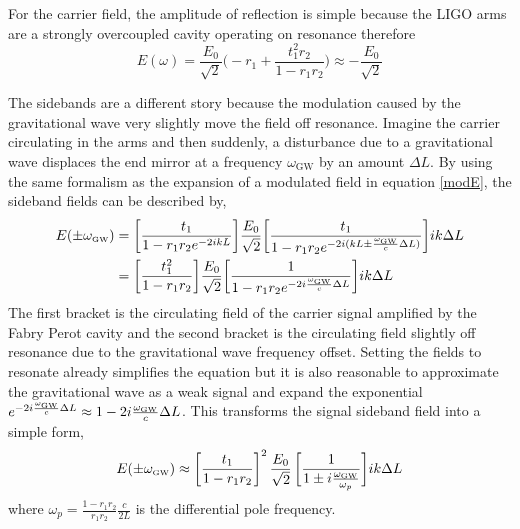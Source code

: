 		For the carrier field, the amplitude of reflection is simple because the LIGO arms are a strongly overcoupled cavity operating on resonance therefore 
		\begin{equation}
			E(\omega) = \frac{E_0}{\sqrt{2}}  \bigg(-r_1 + \frac{t_1^2 r_2}{1-r_1 r_2} \bigg) \approx -\frac{E_0}{\sqrt{2}}
		\end{equation}
		
		The sidebands are a different story because the modulation caused by the gravitational wave very slightly move the field off resonance.  Imagine the carrier circulating in the arms and then suddenly, a disturbance due to a gravitational wave displaces the end mirror at a frequency $\omega_\text{GW}$ by an amount $\Delta L$.   By using the same formalism as the expansion of a modulated field in equation \ref{modE}, the sideband fields can be described by,
		\begin{equation}
		\begin{aligned}
			E(\pm \omega_{\text{\tiny GW}}) &= \bigg[ \frac{t_1}{1-r_1 r_2 e^{-2ikL}}\bigg] \frac{E_0}{\sqrt{2}} \bigg[\frac{t_1}{1-r_1 r_2 e^{-2i (kL \pm \frac{\omega_{\text{\tiny GW}}}{c} \Delta L)}} \bigg] ik\Delta L\\
			& =  \bigg[ \frac{t_1^2}{1-r_1 r_2}\bigg]  \frac{E_0}{\sqrt{2}} \bigg[\frac{ 1}{1-r_1 r_2 e^{-2i \frac{\omega_{\text{\tiny GW}}}{c} \Delta L}} \bigg] ik\Delta L
		\end{aligned}
		\end{equation}
		The first bracket is the circulating field of the carrier signal amplified by the Fabry Perot cavity and the second bracket is the circulating field slightly off resonance due to the gravitational wave frequency offset.  Setting the fields to resonate already simplifies the equation but it is also reasonable to approximate the gravitational wave as a weak signal and expand the exponential $e^{- 2i \frac{\omega_{\text{\tiny GW}}}{c} \Delta L} \approx 1 - 2i\frac{\omega_{\text{\tiny GW}}}{c} \Delta L$.  This transforms the signal sideband field into a simple form,
		\begin{equation}
		E(\pm \omega_{\text{\tiny GW}}) \approx \bigg[\frac{t_1}{1-r_1r_2}\bigg]^2 \, \frac{E_0}{\sqrt{2}} \, \bigg[\frac{1}{1 \pm i \frac{\omega_{\text{\tiny GW}}}{\omega_p}}\bigg] ik\Delta L
		\end{equation}
		where $\omega_p = \frac{1-r_1r_2}{r_1r_2}\frac{c}{2L}$ is the differential pole frequency.
		
